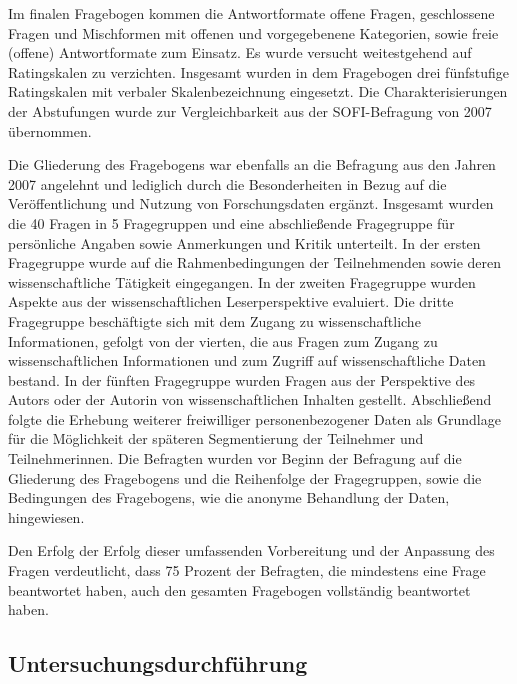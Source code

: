 Im finalen Fragebogen kommen die Antwortformate offene Fragen, geschlossene Fragen und Mischformen mit offenen und vorgegebenene Kategorien, sowie freie (offene) Antwortformate zum Einsatz. Es wurde versucht weitestgehend auf Ratingskalen zu verzichten. Insgesamt wurden in dem Fragebogen drei fünfstufige Ratingskalen mit verbaler Skalenbezeichnung eingesetzt. Die Charakterisierungen der Abstufungen wurde zur Vergleichbarkeit aus der SOFI-Befragung von 2007 übernommen.

Die Gliederung des Fragebogens war ebenfalls an die Befragung aus den Jahren 2007 angelehnt und lediglich durch die Besonderheiten in Bezug auf die Veröffentlichung und Nutzung von Forschungsdaten ergänzt. Insgesamt wurden die 40 Fragen in 5 Fragegruppen und eine abschließende Fragegruppe für persönliche Angaben sowie Anmerkungen und Kritik unterteilt. In der ersten Fragegruppe wurde auf die Rahmenbedingungen der Teilnehmenden sowie deren wissenschaftliche Tätigkeit eingegangen. In der zweiten Fragegruppe wurden Aspekte aus der wissenschaftlichen Leserperspektive evaluiert. Die dritte Fragegruppe beschäftigte sich mit dem Zugang zu wissenschaftliche Informationen, gefolgt von der vierten, die aus Fragen zum Zugang zu wissenschaftlichen Informationen und zum Zugriff auf wissenschaftliche Daten bestand. In der fünften Fragegruppe wurden Fragen aus der Perspektive des Autors oder der Autorin von wissenschaftlichen Inhalten gestellt. Abschließend folgte die Erhebung weiterer freiwilliger personenbezogener Daten als Grundlage für die Möglichkeit der späteren Segmentierung der Teilnehmer und Teilnehmerinnen. Die Befragten wurden vor Beginn der Befragung auf die Gliederung des Fragebogens und die Reihenfolge der Fragegruppen, sowie die Bedingungen des Fragebogens, wie die anonyme Behandlung der Daten, hingewiesen.

Den Erfolg der Erfolg dieser umfassenden Vorbereitung und der Anpassung des Fragen verdeutlicht, dass 75 Prozent der Befragten, die mindestens eine Frage beantwortet haben, auch den gesamten Fragebogen vollständig beantwortet haben.

\subsection{Untersuchungsdurchführung}

